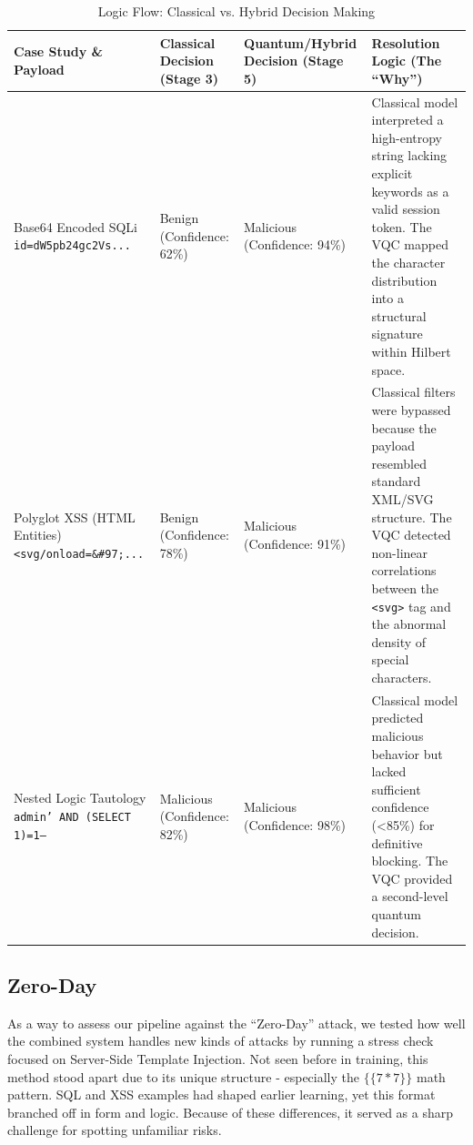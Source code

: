 \documentclass[journal,onecolumn]{IEEEtran}
\begin{document}
\begin{table}[t]
\centering
\caption{Logic Flow: Classical vs. Hybrid Decision Making}
\label{tab:logic_flow}
\footnotesize
\setlength{\tabcolsep}{3pt}
\renewcommand{\arraystretch}{1.2}

\begin{tabular}{|p{3.2cm}|p{3.2cm}|p{3.2cm}|p{5.2cm}|}
\hline
\textbf{Case Study \& Payload} & \textbf{Classical Decision (Stage 3)} & \textbf{Quantum/Hybrid Decision (Stage 5)} & \textbf{Resolution Logic (The ``Why'')} \\
\hline

Base64 Encoded SQLi \newline \texttt{id=dW5pb24gc2Vs...}
& Benign (Confidence: 62\%)
& Malicious (Confidence: 94\%)
& Classical model interpreted a high-entropy string lacking explicit keywords as a valid session token. The VQC mapped the character distribution into a structural signature within Hilbert space. \\
\hline

Polyglot XSS (HTML Entities) \newline \texttt{<svg/onload=\&\#97;...}
& Benign (Confidence: 78\%)
& Malicious (Confidence: 91\%)
& Classical filters were bypassed because the payload resembled standard XML/SVG structure. The VQC detected non-linear correlations between the \texttt{<svg>} tag and the abnormal density of special characters. \\
\hline

Nested Logic Tautology \newline \texttt{admin' AND (SELECT 1)=1--}
& Malicious (Confidence: 82\%)
& Malicious (Confidence: 98\%)
& Classical model predicted malicious behavior but lacked sufficient confidence (<85\%) for definitive blocking. The VQC provided a second-level quantum decision. \\
\hline

\end{tabular}
\end{table}


\subsection{Zero-Day}
As a way to assess our pipeline against the ``Zero-Day'' attack, we tested how well the combined system handles new kinds of attacks by running a stress check focused on Server-Side Template Injection. Not seen before in training, this method stood apart due to its unique structure - especially the $\{\{7*7\}\}$ math pattern. SQL and XSS examples had shaped earlier learning, yet this format branched off in form and logic. Because of these differences, it served as a sharp challenge for spotting unfamiliar risks.
\end{document}

